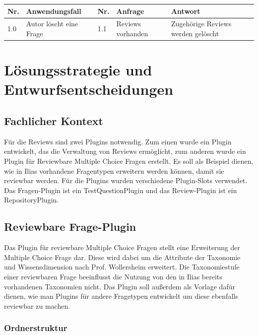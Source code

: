 \documentclass[a4paper]{scrreprt}
\begin{document}
\begin{tabular}{|p{0.5cm}|p{3cm}|p{0.5cm}|p{4cm}|p{4.5cm}|}\hline
Nr. & Anwendungsfall & Nr. & Anfrage & Antwort\\\hline
1.0 & Autor löscht eine Frage & 1.1 & Reviews vorhanden & Zugehörige Reviews werden gelöscht\\\hline
\end{tabular}

\chapter{Lösungsstrategie und Entwurfsentscheidungen}

\section{Fachlicher Kontext}

Für die Reviews sind zwei Plugins notwendig. 
Zum einen wurde ein Plugin entwickelt, das die Verwaltung von Reviews ermöglicht, zum anderen wurde ein Plugin für Reviewbare Multiple Choice Fragen erstellt. 
Es soll als Beispiel dienen, wie in Ilias vorhandene Fragentypen erweitern werden können, damit sie reviewbar werden.
Für die Plugins wurden verschiedene Plugin-Slots verwendet. 
Das Fragen-Plugin ist ein TestQuestionPlugin und das Review-Plugin ist ein RepositoryPlugin.\\ 

\section{Reviewbare Frage-Plugin}

Das Plugin für reviewbare Multiple Choice Fragen stellt eine Erweiterung der Multiple Choice Frage dar. 
Diese wird dabei um die Attribute der Taxonomie und Wissensdimension nach Prof. Wollersheim erweitert. 
Die Taxonomiestufe einer reviewbaren Frage beeinflusst die Nutzung von den in Ilias bereits vorhandenen Taxonomien nicht.
Das Plugin soll außerdem als Vorlage dafür dienen, wie man Plugins für andere Fragetypen entwickelt um diese ebenfalls reviewbar zu machen. \\

\subsection{Ordnerstruktur}
\end{document}
